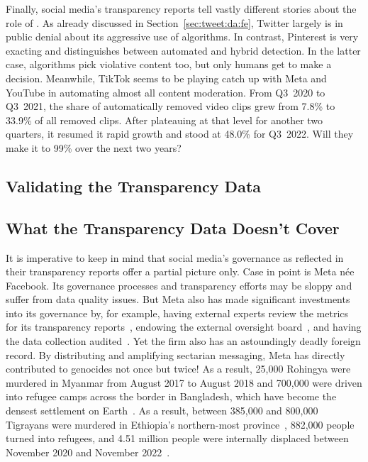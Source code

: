 Finally, social media's transparency reports tell vastly different stories about
the role of \AI. As already discussed in Section~\ref{sec:tweet:da:fe}, Twitter
largely is in public denial about its aggressive use of algorithms. In contrast,
Pinterest is very exacting and distinguishes between automated and hybrid
detection. In the latter case, algorithms pick violative content too, but only
humans get to make a decision. Meanwhile, TikTok seems to be playing catch up
with Meta and YouTube in automating almost all content moderation. From Q3~2020
to Q3~2021, the share of automatically removed video clips grew from 7.8\% to
33.9\% of all removed clips. After plateauing at that level for another two
quarters, it resumed it rapid growth and stood at 48.0\% for Q3~2022. Will they
make it to 99\% over the next two years?


\subsection{Validating the Transparency Data}
\label{sec:census:validation}




\subsection{What the Transparency Data Doesn't Cover}
\label{sec:census:limits}

It is imperative to keep in mind that social media's governance as reflected in
their transparency reports offer a partial picture only. Case in point is Meta
n\'ee Facebook. Its governance processes and transparency efforts may be sloppy
and suffer from data quality issues. But Meta also has made significant
investments into its governance by, for example, having external experts review
the metrics for its transparency reports~\cite{BradfordGriselea2019}, endowing
the external oversight board~\cite{BoteroMarinoGreeneea2020}, and having the
data collection audited~\cite{Sarang2022}. Yet the firm also has an astoundingly
deadly foreign record. By distributing and amplifying sectarian messaging, Meta
has directly contributed to genocides not once but twice! As a result, 25,000
Rohingya were murdered in Myanmar from August 2017 to August 2018 and 700,000
were driven into refugee camps across the border in Bangladesh, which have
become the densest settlement on
Earth~\cite{DeGuzman2022,HumanRightsCouncil2018}. As a result, between 385,000
and 800,000 Tigrayans were murdered in Ethiopia's northern-most
province~\cite{AnnysVandenBemptea2021,ChothiaBekit2022}, 882,000 people turned
into refugees, and 4.51 million people were internally displaced between
November 2020 and November 2022~\cite{UNICEF2023}.

